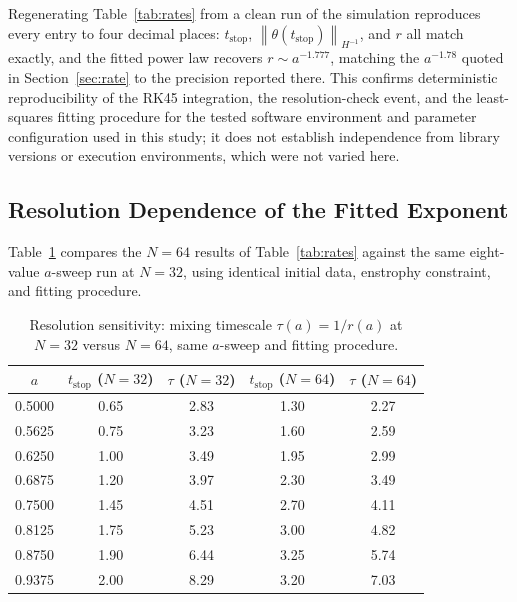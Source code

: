 \documentclass[12pt,a4paper]{article}
\newcommand{\norm}[1]{\left\lVert#1\right\rVert}
\theoremstyle{definition}
\theoremstyle{plain}
\begin{document}
Regenerating Table~\ref{tab:rates} from a clean run of the simulation
reproduces every entry to four decimal places: $t_{\text{stop}}$,
$\norm{\theta(t_{\text{stop}})}_{H^{-1}}$, and $r$ all match exactly,
and the fitted power law recovers $r\sim a^{-1.777}$, matching the
$a^{-1.78}$ quoted in Section~\ref{sec:rate} to the precision reported
there. This confirms deterministic reproducibility of the RK45
integration, the resolution-check event, and the least-squares fitting
procedure for the tested software environment and parameter configuration
used in this study; it does not establish independence from library
versions or execution environments, which were not varied here.

\subsection{Resolution Dependence of the Fitted Exponent}

Table~\ref{tab:resolution} compares the $N=64$ results of
Table~\ref{tab:rates} against the same eight-value $a$-sweep run at
$N=32$, using identical initial data, enstrophy constraint, and fitting
procedure.

\begin{table}[H]
  \centering
  \setlength{\tabcolsep}{9pt}
  \caption{%
    Resolution sensitivity: mixing timescale $\tau(a)=1/r(a)$ at
    $N=32$ versus $N=64$, same $a$-sweep and fitting procedure.
  }
  \label{tab:resolution}
  \begin{tabular}{ccccc}
    \toprule
    $a$ & $t_{\text{stop}}$ ($N{=}32$) & $\tau$ ($N{=}32$)
        & $t_{\text{stop}}$ ($N{=}64$) & $\tau$ ($N{=}64$) \\
    \midrule
    0.5000 & 0.65 & 2.83 & 1.30 & 2.27 \\
    0.5625 & 0.75 & 3.23 & 1.60 & 2.59 \\
    0.6250 & 1.00 & 3.49 & 1.95 & 2.99 \\
    0.6875 & 1.20 & 3.97 & 2.30 & 3.49 \\
    0.7500 & 1.45 & 4.51 & 2.70 & 4.11 \\
    0.8125 & 1.75 & 5.23 & 3.00 & 4.82 \\
    0.8750 & 1.90 & 6.44 & 3.25 & 5.74 \\
    0.9375 & 2.00 & 8.29 & 3.20 & 7.03 \\
    \bottomrule
  \end{tabular}
\end{table}
\end{document}
